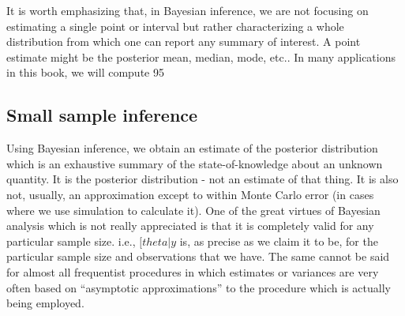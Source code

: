   It is worth emphasizing that, in Bayesian inference, we are not focusing on estimating a single point or interval but rather characterizing a whole distribution from which one can report any summary of interest. A point estimate might be the posterior mean, median, mode, etc..  In many applications in this book, we will compute 95%



\subsection{Small sample inference}
Using Bayesian inference, we obtain an estimate of the posterior distribution which is an exhaustive summary of the state-of-knowledge about an unknown quantity. It is the posterior distribution - not an estimate of that thing. It is also not, usually, an approximation except to within Monte Carlo error (in cases where we use simulation to calculate it).  One of the great virtues of Bayesian analysis which is not really appreciated is that it is completely valid for any particular sample size. i.e., $[theta|y$ is, as precise as we claim it to be, for the particular sample size and observations that we have.  The same cannot be said for almost all frequentist procedures in which estimates or variances are very often based on ``asymptotic approximations'' to the procedure which is actually being employed.  

